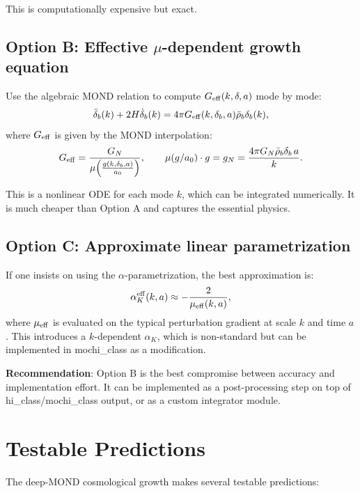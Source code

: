 \documentclass[11pt]{article}
\newcommand{\Geff}{G_{\rm eff}}
\newcommand{\aM}{a_0}
\begin{document}
This is computationally expensive but exact.

\subsection{Option B: Effective $\mu$-dependent growth equation}

Use the algebraic MOND relation to compute $\Geff(k, \delta, a)$
mode by mode:
\begin{equation}
\ddot\delta_b(k) + 2H\dot\delta_b(k) = 4\pi\Geff(k,\delta_b,a)\bar\rho_b\delta_b(k),
\end{equation}
where $\Geff$ is given by the MOND interpolation:
\begin{equation}
\Geff = \frac{G_N}{\mu\!\left(\frac{g(k,\delta_b,a)}{\aM}\right)},
\qquad
\mu(g/\aM)\cdot g = g_N = \frac{4\pi G_N\bar\rho_b\delta_b\,a}{k}.
\end{equation}

This is a nonlinear ODE for each mode $k$, which can be integrated
numerically. It is much cheaper than Option A and captures the
essential physics.

\subsection{Option C: Approximate linear parametrization}

If one insists on using the $\alpha$-parametrization, the best
approximation is:
\begin{equation}
\alpha_K^{\rm eff}(k, a) \approx -\frac{2}{\mu_{\rm eff}(k, a)},
\end{equation}
where $\mu_{\rm eff}$ is evaluated on the typical perturbation
gradient at scale $k$ and time $a$. This introduces a
$k$-dependent $\alpha_K$, which is non-standard but can be
implemented in mochi\_class as a modification.

\textbf{Recommendation}: Option B is the best compromise between
accuracy and implementation effort. It can be implemented as a
post-processing step on top of hi\_class/mochi\_class output, or
as a custom integrator module.

\section{Testable Predictions}

The deep-MOND cosmological growth makes several testable predictions:
\end{document}

